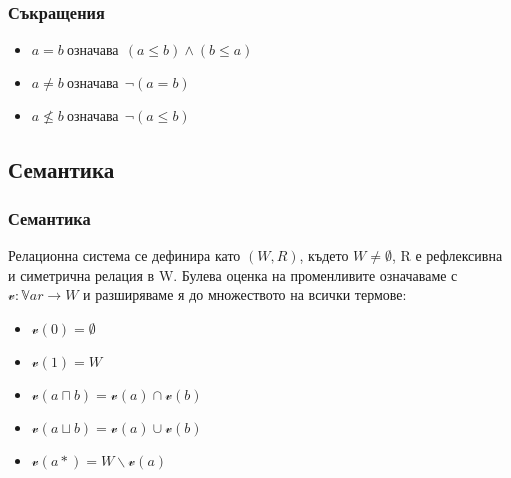 \documentclass{beamer}
\begin{document}
\begin{frame}\frametitle{Съкращения}
		\begin{itemize}
		\item $a = b\:\textit{означава}\:\: (a \le b) \land (b \le a)$
		\item $a \neq b\:\textit{означава}\:\: \neg (a = b) $
		\item $a \nleq b\:\textit{означава}\:\: \neg (a \le b)$
		\end{itemize}
\end{frame}

\subsection{Семантика}
\begin{frame}\frametitle{Семантика}
	Релационна система се дефинира като $(W, R)$, където $W \neq \emptyset$, R е рефлексивна и симетрична релация в W.
	\newline
	\newline
	Булева оценка на променливите означаваме с  $\mathscr{v}: \mathbb{V}ar \rightarrow W$ и разширяваме я до множеството на всички термове:
		\begin{itemize}
			\item $\mathscr{v}(0) = \emptyset$
			\item $\mathscr{v}(1) = W$
			\item $\mathscr{v}(a \sqcap b) = \mathscr{v}(a) \cap \mathscr{v}(b)$
			\item $\mathscr{v}(a \sqcup b) = \mathscr{v}(a) \cup \mathscr{v}(b)$
			\item $\mathscr{v}(a*) = W \backslash  \mathscr{v}(a)$
		\end{itemize}
	
\end{frame}
\end{document}
